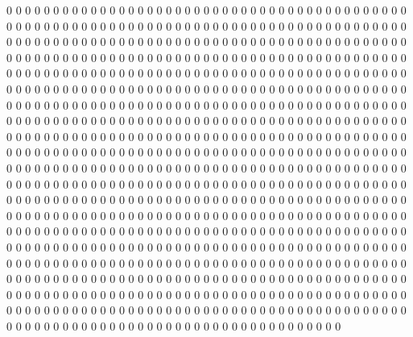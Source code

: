 0 0 0 0 0 0 0 0 0 0 0 0 0 0 0 0 0 0 0 0 0 0 0 0 0 0 0 0 0 0 0 0 0 0 0 0 0 0 0 0 0 0 0 0 0 0 0 0 0 0 0 0 0 0 0 0 0 0 0 0 0 0 0 0 0 0 0 0 0 0 0 0 0 0 0 0 0 0 0 0 0 0 0 0 0 0 0 0 0 0 0 0 0 0 0 0 0 0 0 0 0 0 0 0 0 0 0 0 0 0 0 0 0 0 0 0 0 0 0 0 0 0 0 0 0 0 0 0
0 0 0 0 0 0 0 0 0 0 0 0 0 0 0 0 0 0 0 0 0 0 0 0 0 0 0 0 0 0 0 0 0 0 0 0 0 0 0 0 0 0 0 0 0 0 0 0 0 0 0 0 0 0 0 0 0 0 0 0 0 0 0 0 0 0 0 0 0 0 0 0 0 0 0 0 0 0 0 0 0 0 0 0 0 0 0 0 0 0 0 0 0 0 0 0 0 0 0 0 0 0 0 0 0 0 0 0 0 0 0 0 0 0 0 0 0 0 0 0 0 0 0 0 0 0 0 0
0 0 0 0 0 0 0 0 0 0 0 0 0 0 0 0 0 0 0 0 0 0 0 0 0 0 0 0 0 0 0 0 0 0 0 0 0 0 0 0 0 0 0 0 0 0 0 0 0 0 0 0 0 0 0 0 0 0 0 0 0 0 0 0 0 0 0 0 0 0 0 0 0 0 0 0 0 0 0 0 0 0 0 0 0 0 0 0 0 0 0 0 0 0 0 0 0 0 0 0 0 0 0 0 0 0 0 0 0 0 0 0 0 0 0 0 0 0 0 0 0 0 0 0 0 0 0 0
0 0 0 0 0 0 0 0 0 0 0 0 0 0 0 0 0 0 0 0 0 0 0 0 0 0 0 0 0 0 0 0 0 0 0 0 0 0 0 0 0 0 0 0 0 0 0 0 0 0 0 0 0 0 0 0 0 0 0 0 0 0 0 0 0 0 0 0 0 0 0 0 0 0 0 0 0 0 0 0 0 0 0 0 0 0 0 0 0 0 0 0 0 0 0 0 0 0 0 0 0 0 0 0 0 0 0 0 0 0 0 0 0 0 0 0 0 0 0 0 0 0 0 0 0 0 0 0
0 0 0 0 0 0 0 0 0 0 0 0 0 0 0 0 0 0 0 0 0 0 0 0 0 0 0 0 0 0 0 0 0 0 0 0 0 0 0 0 0 0 0 0 0 0 0 0 0 0 0 0 0 0 0 0 0 0 0 0 0 0 0 0 0 0 0 0 0 0 0 0 0 0 0 0 0 0 0 0 0 0 0 0 0 0 0 0 0 0 0 0 0 0 0 0 0 0 0 0 0 0 0 0 0 0 0 0 0 0 0 0 0 0 0 0 0 0 0 0 0 0 0 0 0 0 0 0
0 0 0 0 0 0 0 0 0 0 0 0 0 0 0 0 0 0 0 0 0 0 0 0 0 0 0 0 0 0 0 0 0 0 0 0 0 0 0 0 0 0 0 0 0 0 0 0 0 0 0 0 0 0 0 0 0 0 0 0 0 0 0 0 0 0 0 0 0 0 0 0 0 0 0 0 0 0 0 0 0 0 0 0 0 0 0 0 0 0 0 0 0 0 0 0 0 0 0 0 0 0 0 0 0 0 0 0 0 0 0 0 0 0 0 0 0 0 0 0 0 0 0 0 0 0 0 0
0 0 0 0 0 0 0 0 0 0 0 0 0 0 0 0 0 0 0 0 0 0 0 0 0 0 0 0 0 0 0 0 0 0 0 0 0 0 0 0 0 0 0 0 0 0 0 0 0 0 0 0 0 0 0 0 0 0 0 0 0 0 0 0 0 0 0 0 0 0 0 0 0 0 0 0 0 0 0 0 0 0 0 0 0 0 0 0 0 0 0 0 0 0 0 0 0 0 0 0 0 0 0 0 0 0 0 0 0 0 0 0 0 0 0 0 0 0 0 0 0 0 0 0 0 0 0 0
